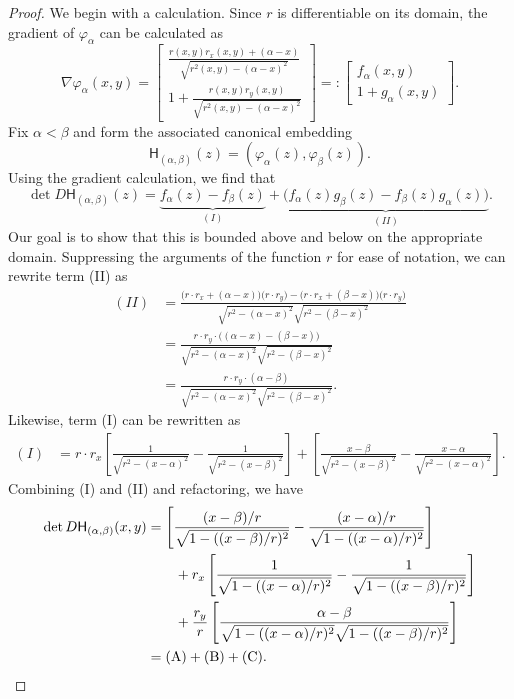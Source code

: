 \documentclass[12pt]{amsart}
\theoremstyle{definition}
\numberwithin{equation}{section}
\begin{document}
\begin{proof}
    We begin with a calculation. Since $r$ is differentiable on its domain, the gradient of $\varphi_{\alpha}$ can be calculated as
    $$\nabla \varphi_{\alpha}(x, y) = \begin{bmatrix} \frac{r(x, y) r_x(x, y) + (\alpha - x)}{\sqrt{r^2(x, y) - (\alpha - x)^2}} \\ 1 + \frac{r(x, y) r_y(x, y)}{\sqrt{r^2(x, y) - (\alpha - x)^2}}\end{bmatrix} =: \begin{bmatrix} f_{\alpha}(x, y) \\ 1 + g_{\alpha}(x, y)\end{bmatrix}.$$
    Fix $\alpha < \beta$ and form the associated canonical embedding
    $$\mathsf{H}_{(\alpha, \beta)}(z) = (\varphi_{\alpha}(z), \varphi_{\beta}(z)).$$
    Using the gradient calculation, we find that
    $$\det D\mathsf{H}_{(\alpha, \beta)}(z) = \underbrace{f_{\alpha}(z) - f_{\beta}(z)}_{(I)} + \underbrace{\big(f_{\alpha}(z) g_{\beta}(z) - f_{\beta}(z) g_{\alpha}(z)\big)}_{(II)}.$$
    Our goal is to show that this is bounded above and below on the appropriate domain. Suppressing the arguments of the function $r$ for ease of notation, we can rewrite term (II) as 
    \begin{align*}
        (II) &= \frac{\big(r \cdot r_x + (\alpha - x)\big)\big(r\cdot r_y\big) - \big(r \cdot r_x + (\beta - x)\big)\big(r\cdot r_y\big)}{\sqrt{r^2 - (\alpha - x)^2}\sqrt{r^2 - (\beta - x)^2}} \\
        &= \frac{r \cdot r_y \cdot \big((\alpha - x) - (\beta - x)\big)}{\sqrt{r^2 - (\alpha - x)^2}\sqrt{r^2 - (\beta - x)^2}} \\
        &= \frac{r \cdot r_y \cdot (\alpha - \beta)}{\sqrt{r^2 - (\alpha - x)^2}\sqrt{r^2 - (\beta - x)^2}}.
    \end{align*}
    Likewise, term (I) can be rewritten as
    \begin{align*}
        (I) &= r \cdot r_x \left[\frac{1}{\sqrt{r^2 - (x - \alpha)^2}} - \frac{1}{\sqrt{r^2 - (x - \beta)^2}}\right] + \left[\frac{x - \beta}{\sqrt{r^2 - (x - \beta)^2}} - \frac{x - \alpha}{\sqrt{r^2 - (x - \alpha)^2}}\right].
    \end{align*}
    Combining (I) and (II) and refactoring, we have
    \begin{align*}
        \det D\mathsf{H}_{(\alpha, \beta)}(x, y) &= \left[\frac{(x - \beta) / r}{\sqrt{1 - ((x - \beta)/r)^2}} - \frac{(x - \alpha) / r}{\sqrt{1 - ((x - \alpha)/r)^2}} \right] \\
        &\quad\quad + r_x \left[\frac{1}{\sqrt{1 - ((x - \alpha) / r)^2}} - \frac{1}{\sqrt{1 - ((x - \beta)/r)^2}}\right] \\
        &\quad\quad + \frac{r_y}{r} \left[\frac{\alpha - \beta}{\sqrt{1 - ((x - \alpha)/r)^2} \sqrt{1 - ((x - \beta)/r)^2}}\right] \\
        &= (\text{A}) + (\text B) + (\text C).
    \end{align*}


\end{proof}
\end{document}
